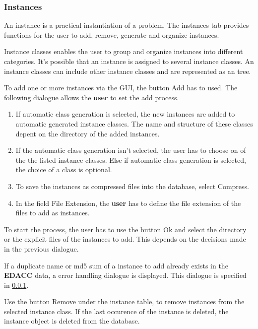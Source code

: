 \subsubsection{Instances}
 An instance is a practical instantiation of a problem. The instances tab provides functions for the user to add, remove, generate and organize instances.

 Instance classes enables the user to group and organize instances into different categories. It's possible that an instance is assigned to several instance classes. An instance classes can include other instance classes and are represented as an tree.

 To add one or more instances via the GUI, the button Add has to used. The following dialogue allows the \textbf{user} to set the add process.
\begin{enumerate}
	\item If automatic class generation is selected, the new instances are added to  automatic generated instance classes. The name and structure of these classes depent on the directory of the added instances.
	
	\item If the automatic class generation isn't selected, the user has to choose on of the the listed instance classes. Else if automatic class generation is selected, the choice of a class is optional.
	
	\item To save the instances as compressed files into the database, select Compress.
	
	\item In the field File Extension, the \textbf{user} has to define the file extension of the files to add as instances.
\end{enumerate}

To start the process, the user has to use the button Ok and select the directory  or the explicit files of the instances to add. This depends on the decisions made in the previous dialogue.

\attention If a duplicate name or md5 sum of a instance to add already exists in the \textbf{EDACC} data, a error handling dialogue is displayed. This dialogue is specified in \ref{}.
 


 Use the button Remove under the instance table, to remove instances from the selected instance class. If the last occurence of the instance is deleted, the instance object is deleted from the database.

